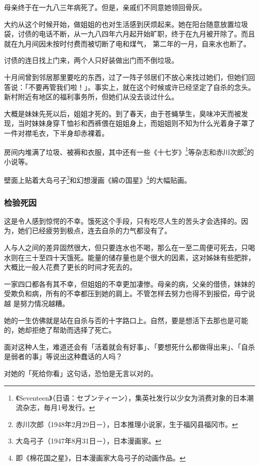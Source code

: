 \documentclass[UTF8]{ctexart}
\begin{document}
母亲终于在一九八三年病死了。但是，亲戚们不同意她领回骨灰。

大约从这个时候开始，做姐姐的也对生活感到厌烦起来。她在阳台随意放置垃圾袋，讨债的电话不断，从一九八四年六月起开始旷职，终于在九月被开除了。而且就在九月间因未按时付费而被切断了电和煤气， 第二年的一月，自来水也断了。

讨债的连日找上门来，两个人只好装做出门而不倒垃圾。

十月间曾到邻居那里要吃的东西，过了一阵子邻居们不放心来找过她们，但她们回答说：「不要再管我们啦！」。事实上，就在这个时候或许已经坚定了自杀的念头。新村附近有地区的福利事务所，但她们从没去谈过什么。

大概是妹妹先死以后，姐姐才死的。到了春天，由于苍蝇孳生，臭味冲天而被发现，当时妹妹身穿Ｔ恤衫和西裤偎在姐姐身上，而姐姐则不知为什么光着身子罩了一件对襟毛衣，下半身却赤裸着。

房间内堆满了垃圾、被褥和衣服，其中还有一些《十七岁》\footnote{《Seventeen》（日语：セブンティーン），集英社发行以少女为消费对象的日本潮流杂志，毎月1号发行。}等杂志和赤川次郎\footnote{赤川次郎（1948年2月29日－\qquad \qquad），日本推理小说家，生于福冈县福冈市。}的小说等。

壁面上贴着大岛弓子\footnote{大岛弓子（1947年8月31日－\qquad \qquad ），日本漫画家。}和幻想漫画《綿の国星》\footnote{即《棉花国之星》，日本漫画家大岛弓子的动画作品。}的大幅贴画。

\subsubsection*{检验死因}

这是令人感到惊愕的不幸。饿死这个手段，只有吃尽人生的苦头才会选择的。因为，她们已经疲劳到极点，连去自杀的力气都没有了。

人与人之间的差异固然很大，但只要连水也不喝，那么在一至二周便可死去，只喝水则在三十至四十天饿死。能量的储存量也是个很大的因素，这对姊妹有些肥胖，大概比一般人花费了更长的时间才死去的。

一家四口都各有其不幸，但姐姐的不幸更加凄惨。母亲的病，父亲的借债，妹妹的受欺负和病，所有的不幸都压到她的肩上。不管怎样去努力也得不到报偿，毋宁说越 是努力情况越糟。

她的一生仿佛就是站在自杀与否的十字路口上。自然，要是想活下去那也是可能的，她却拒绝了帮助而选择了死亡。

面对这种人生，难道还会有「活着就会有好事」、「要想死什么都做得出来」、「自杀是弱者的事」等说出这种蠢话的人吗？

对她的「死给你看」这句话，恐怕是无言以对的。
\end{document}

